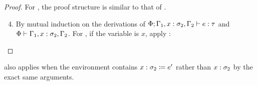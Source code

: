 \begin{proof}
  For ,
  the proof structure is similar to that of .
  \begin{enumerate}[noitemsep] \setcounter{enumi}{3}
    \item By mutual induction on the derivations of
      $\type{\Phi; \Gamma_1, \annot{x}{\sigma_2}, \Gamma_2}{e}{\tau}$ and
      $\wf{\Phi}{\Gamma_1, \annot{x}{\sigma_2}, \Gamma_2}$.
      For , if the variable is $x$, apply :
      \begin{mathpar}
      \end{mathpar}
  \end{enumerate}
\end{proof}

\begin{corollary}
 also applies when the environment contains
$\define{x}{\sigma_2}{e'}$ rather than $\annot{x}{\sigma_2}$
by the exact same arguments.
\end{corollary}

